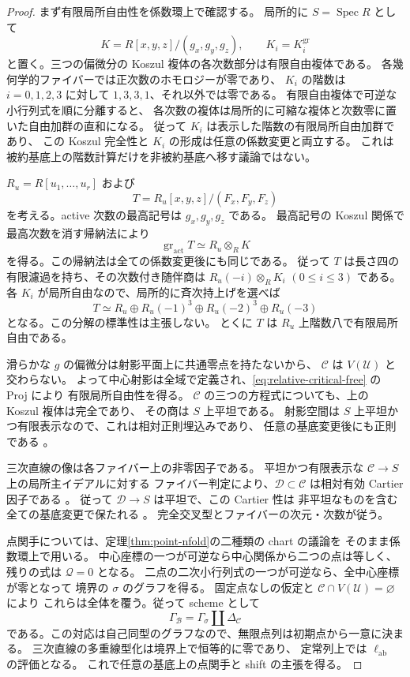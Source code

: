 \begin{proof}
まず有限局所自由性を係数環上で確認する。
局所的に $S=\operatorname{Spec}R$ として
\[
 K=R[x,y,z]/(g_x,g_y,g_z),\qquad K_i=K_i^{\mathrm{gr}}
\]
と置く。三つの偏微分の Koszul 複体の各次数部分は有限自由複体である。
各幾何学的ファイバーでは正次数のホモロジーが零であり、
$K_i$ の階数は $i=0,1,2,3$ に対して $1,3,3,1$、それ以外では零である。
有限自由複体で可逆な小行列式を順に分離すると、
各次数の複体は局所的に可縮な複体と次数零に置いた自由加群の直和になる。
従って $K_i$ は表示した階数の有限局所自由加群であり、
この Koszul 完全性と $K_i$ の形成は任意の係数変更と両立する。
これは被約基底上の階数計算だけを非被約基底へ移す議論ではない。

$R_u=R[u_1,\ldots,u_r]$ および
\[
 T=R_u[x,y,z]/(F_x,F_y,F_z)
\]
を考える。active 次数の最高記号は $g_x,g_y,g_z$ である。
最高記号の Koszul 関係で最高次数を消す帰納法により
\[
 \operatorname{gr}_{\mathrm{act}}T\simeq R_u\otimes_R K
\]
を得る。この帰納法は全ての係数変更後にも同じである。
従って $T$ は長さ四の有限濾過を持ち、その次数付き随伴商は
$R_u(-i)\otimes_R K_i$ $(0\leq i\leq3)$ である。
各 $K_i$ が局所自由なので、局所的に斉次持上げを選べば
\begin{equation}\label{eq:relative-critical-free}
 T\simeq R_u\oplus R_u(-1)^3\oplus
                 R_u(-2)^3\oplus R_u(-3)
\end{equation}
となる。この分解の標準性は主張しない。
とくに $T$ は $R_u$ 上階数八で有限局所自由である。

滑らかな $g$ の偏微分は射影平面上に共通零点を持たないから、
$\mathcal C$ は $V(\mathcal U)$ と交わらない。
よって中心射影は全域で定義され、\eqref{eq:relative-critical-free} の Proj により
有限局所自由性を得る。
$\mathcal C$ の三つの方程式についても、上の Koszul 複体は完全であり、
その商は $S$ 上平坦である。
射影空間は $S$ 上平坦かつ有限表示なので、これは相対正則埋込みであり、
任意の基底変更後にも正則である
\cite[Tags~063P, 063U]{NFMStacksRelativeRegular}。

三次直線の像は各ファイバー上の非零因子である。
平坦かつ有限表示な $\mathcal C\to S$ 上の局所主イデアルに対する
ファイバー判定により、$\mathcal D\subset\mathcal C$ は相対有効 Cartier 因子である
\cite[Tag~062Y]{NFMStacksRelativeCartier}。
従って $\mathcal D\to S$ は平坦で、この Cartier 性は
非平坦なものを含む全ての基底変更で保たれる
\cite[Tag~056Q]{NFMStacksRelativeCartier}。
完全交叉型とファイバーの次元・次数が従う。

点関手については、定理\ref{thm:point-nfold}の二種類の chart の議論を
そのまま係数環上で用いる。
中心座標の一つが可逆なら中心関係から二つの点は等しく、
残りの式は $\mathcal Q=0$ となる。
二点の二次小行列式の一つが可逆なら、全中心座標が零となって
境界の $\sigma$ のグラフを得る。
固定点なしの仮定と $\mathcal C\cap V(\mathcal U)=\varnothing$ により
これらは全体を覆う。従って scheme として
\[
 \Gamma_{\mathcal B}=\Gamma_\sigma\amalg\Delta_{\mathcal C}
\]
である。この対応は自己同型のグラフなので、無限点列は初期点から一意に決まる。
三次直線の多重線型化は境界上で恒等的に零であり、
定常列上では $\ell_{\mathrm{ab}}$ の評価となる。
これで任意の基底上の点関手と shift の主張を得る。


\end{proof}
